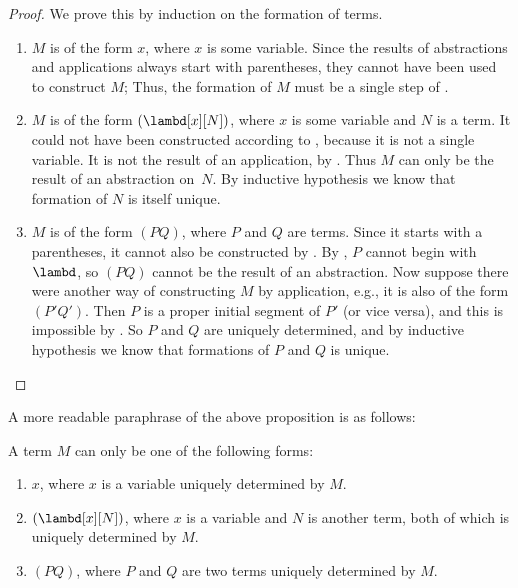 \documentclass[../../../include/open-logic-section]{subfiles}
\begin{document}
\begin{proof}
  We prove this by induction on the formation of terms. 
  \begin{enumerate}
    \item $M$ is of the form
      $x$, where $x$ is some variable. Since the results of abstractions and applications always start with parentheses, they cannot have been used to
      construct $M$; Thus, the formation of $M$ must be a single step
      of .
    \item $M$ is of the form $(\lambd[x][N])$, where $x$ is some
      variable and $N$ is a term. It could not have been constructed
      according to ,
      because it is not a single variable.  It is not the result of an
      application, by . Thus $M$ can only be the
      result of an abstraction on~$N$.  By inductive hypothesis we
      know that formation of $N$ is itself unique.
    \item $M$ is of the form $(PQ)$, where $P$ and $Q$ are terms.
      Since it starts with a parentheses, it cannot also be
      constructed by
      .  By
      , $P$ cannot begin with $\lambd$, so
      $(PQ)$ cannot be the result of an abstraction.  Now suppose
      there were another way of constructing $M$ by application, e.g.,
      it is also of the form $(P'Q')$. Then $P$ is a proper initial
      segment of $P'$ (or vice versa), and this is impossible by
      . So $P$ and $Q$ are uniquely
      determined, and by inductive hypothesis we know that formations
      of $P$ and $Q$ is unique.
  \end{enumerate}
\end{proof}

A more readable paraphrase of the above proposition is as follows:
\begin{prop}
  A term $M$ can only be one of the following forms:
  \begin{enumerate}
    \item $x$, where $x$ is a variable uniquely determined by $M$.
    \item $(\lambd[x][N])$, where $x$ is a variable and $N$ is
      another term, both of which is uniquely determined by $M$.
    \item $(PQ)$, where $P$ and $Q$ are two terms uniquely
      determined by $M$.
  \end{enumerate}
\end{prop}
\end{document}
